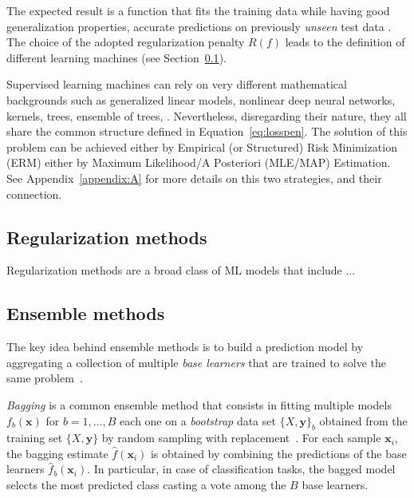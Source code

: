     The expected result is a function that fits the training data while having good generalization properties, \ie accurate predictions on previously  \textit{unseen} test data \cite{hastie2009elements}. The choice of the adopted regularization penalty $R(f)$ leads to the definition of different learning machines (see Section~\ref{subsec:regularization_methods}).
        
       

    Supervised learning machines can rely on very different mathematical backgrounds such as generalized linear models, nonlinear deep neural networks, kernels, trees, ensemble of trees, \etc. Nevertheless, disregarding their nature, they all share the common structure defined in Equation~\eqref{eq:losspen}.
    The solution of this problem can be achieved either by Empirical (or Structured) Risk Minimization (\ac{ERM}) either by Maximum Likelihood/A Posteriori (\ac{MLE}/\ac{MAP}) Estimation. See Appendix~\ref{appendix:A} for more details on this two strategies, and their connection.      

    \subsection{Regularization methods} \label{subsec:regularization_methods}
    Regularization methods are a broad class of ML models that include ...

    \subsection{Ensemble methods}

    The key idea behind ensemble methods is to build a prediction model by aggregating a collection of multiple \textit{base learners} that are trained to solve the same problem~\citep{zhou2012ensemble}.

    \textit{Bagging} is a common ensemble method that consists in fitting multiple models $f_b(\bm{x})$ for $b=1,\dots,B$ each one on a \textit{bootstrap} data set $\{X,\bm{y}\}_b$ obtained from the training set $\{X,\bm{y}\}$ by random sampling with replacement~\citep{hastie2009elements}. For each sample $\bm{x}_i$, the bagging estimate $\hat{f}(\bm{x}_i)$ is obtained by combining the predictions of the base learners $\hat{f}_b(\bm{x}_i)$. In particular, in case of classification tasks, the bagged model selects the most predicted class casting a vote among the $B$ base learners.

